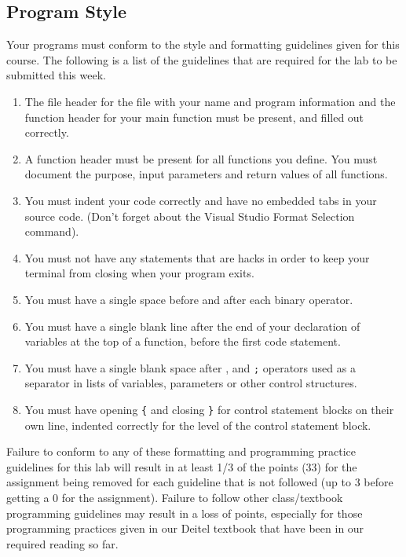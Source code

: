 \documentclass[11pt]{article}
\begin{document}
\subsection*{Program Style}
\label{sec-5-2}

Your programs must conform to the style and formatting guidelines given for this course.
The following is a list of the guidelines that are required for the lab to be submitted
this week.

\begin{enumerate}
\item The file header for the file with your name and program information
and the function header for your main function must be present, and
filled out correctly.
\item A function header must be present for all functions you define.
You must document the purpose, input parameters and return values
of all functions.
\item You must indent your code correctly and have no embedded tabs in
your source code. (Don't forget about the Visual Studio Format
Selection command).
\item You must not have any statements that are hacks in order to keep
your terminal from closing when your program exits.
\item You must have a single space before and after each binary operator.
\item You must have a single blank line after the end of your declaration
of variables at the top of a function, before the first code
statement.
\item You must have a single blank space after , and \verb~;~ operators used as a
separator in lists of variables, parameters or other control
structures.
\item You must have opening \verb~{~ and closing \verb~}~ for control statement blocks
on their own line, indented correctly for the level of the control
statement block.
\end{enumerate}

Failure to conform to any of these formatting and programming practice
guidelines for this lab will result in at least 1/3 of the points (33)
for the assignment being removed for each guideline that is not
followed (up to 3 before getting a 0 for the assignment). Failure to
follow other class/textbook programming guidelines may result in a
loss of points, especially for those programming practices given in
our Deitel textbook that have been in our required reading so far.
\end{document}
